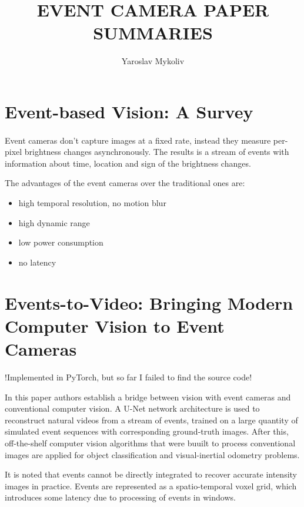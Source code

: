 \documentclass[10pt,a4paper]{article}
\author{Yaroslav Mykoliv}
\title{EVENT CAMERA PAPER SUMMARIES}
\begin{document}
\maketitle

\section{Event-based Vision: A Survey}
\paragraph{}
Event cameras don't capture images at a fixed rate, instead they measure per-pixel brightness changes asynchronously.
The results is a stream of events with information about time, location and sign of the brightness changes.

The advantages of the event cameras over the traditional ones are: 
\begin{itemize}
\item high temporal resolution, no motion blur
\item high dynamic range
\item low power consumption
\item no latency
\end{itemize}
\subsection{}

\section{Events-to-Video: Bringing Modern Computer Vision to Event Cameras}
!Implemented in PyTorch, but so far I failed to find the source code!

In this paper authors establish a bridge between vision with event cameras and conventional computer vision.
A U-Net network architecture is used to reconstruct natural videos from a stream of events, trained on a large quantity of simulated event sequences with corresponding ground-truth images.
After this, off-the-shelf computer vision algorithms that were buuilt to process conventional images are applied for object classification and visual-inertial odometry problems.

It is noted that events cannot be directly integrated to recover accurate intensity images in practice.
Events are represented as a spatio-temporal voxel grid, which introduces some latency due to processing of events in windows.
\end{document}
